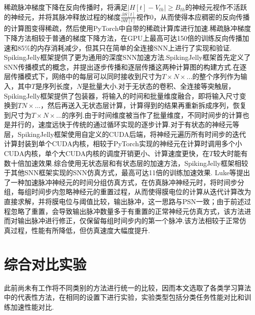 \documentclass{SCIS2020cn}
\begin{document}
稀疏脉冲梯度下降\cite{perez-nieves2021sparse}在反向传播时，将满足$|H[t]-V_{th}| \ge B_{th}$的神经元视作不活跃的神经元，并将其脉冲释放过程的梯度$\frac{\partial S[t]}{\partial H[t]}$视作0，从而使得本应稠密的反向传播的计算图变得稀疏，然后使用PyTorch中自带的稀疏计算库进行加速.稀疏脉冲梯度下降方法相较于普通的梯度下降方法，在GPU上最高可达150倍的训练反向传播加速和85\%的内存消耗减少，但其只在简单的全连接SNN上进行了实现和验证.
SpikingJelly框架\cite{doi:10.1126/sciadv.adi1480}提供了更为通用的深度SNN加速方法.SpikingJelly框架首先定义了SNN传播模式的概念，并提出逐步传播和逐层传播这两种计算图的构建方式.在逐层传播模式下，网络中的每层可以同时接收到尺寸为$T\times N \times ...$的整个序列作为输入，其中$T$是序列长度，$N$是批量大小.对于无状态的卷积、全连接等突触层，SpikingJelly框架提供了包装器，将输入的时间和批量维度融合，即将输入尺寸变换到$TN \times ...$，然后再送入无状态层计算，计算得到的结果再重新拆成序列，恢复到尺寸为$T\times N \times ...$的序列.由于时间维度被当作了批量维度，不同时间步的计算也是并行的，速度远快于传统的通过循环实现的逐步计算.对于有状态的神经元等层，SpikingJelly框架使用自定义的CUDA后端，将神经元遍历所有时间步的迭代计算封装到单个CUDA内核，相较于PyTorch实现的神经元在计算时调用多个小CUDA内核，单个大CUDA内核的调度开销更小、计算速度更快，在$T$较大时能有数十倍加速效果.综合使用无状态层和有状态层的加速方法，SpikingJelly框架相较于其他SNN框架实现的SNN仿真方式，最高可达11倍的训练加速效果.
Luke等\cite{NEURIPS2023_b9f253c2}提出了一种加速脉冲神经元的时间分组仿真方式，在仿真脉冲神经元时，将时间步分组，每组时间步内忽略神经元的重置过程，从而使得膜电位的计算从迭代计算改为直接求解，并将膜电位与阈值比较，输出脉冲，这一思路与PSN\cite{fang2023parallel}一致；由于前述过程忽略了重置，会导致输出脉冲数量多于有重置的正常神经元仿真方式，该方法进而对输出脉冲进行修正，仅保留每组时间步内的第一个脉冲.该方法相较于正常仿真过程，性能有所降低，但仿真速度大幅度提升.

\section{综合对比实验}
此前尚未有工作将不同类别的方法进行统一的比较，因而本文选取了各类学习算法中的代表性方法，在相同的设置下进行实验，实验类型包括分类任务性能对比和训练加速性能对比.
\end{document}
